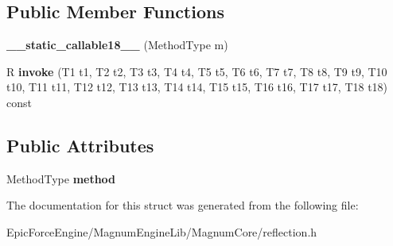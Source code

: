\subsection*{Public Member Functions}
\begin{DoxyCompactItemize}
\item 
{\bfseries \+\_\+\+\_\+static\+\_\+callable18\+\_\+\+\_\+} (Method\+Type m)\hypertarget{structagm_1_1reflection_1_1____static__callable18_____aedd0ddf4d37761fbb4f92e4c43f5e955}{}\label{structagm_1_1reflection_1_1____static__callable18_____aedd0ddf4d37761fbb4f92e4c43f5e955}

\item 
R {\bfseries invoke} (T1 t1, T2 t2, T3 t3, T4 t4, T5 t5, T6 t6, T7 t7, T8 t8, T9 t9, T10 t10, T11 t11, T12 t12, T13 t13, T14 t14, T15 t15, T16 t16, T17 t17, T18 t18) const \hypertarget{structagm_1_1reflection_1_1____static__callable18_____ad4e4f3c41e154b09f489d0ace9b7611f}{}\label{structagm_1_1reflection_1_1____static__callable18_____ad4e4f3c41e154b09f489d0ace9b7611f}

\end{DoxyCompactItemize}
\subsection*{Public Attributes}
\begin{DoxyCompactItemize}
\item 
Method\+Type {\bfseries method}\hypertarget{structagm_1_1reflection_1_1____static__callable18_____ad492e86dbfdf10c88bfc394c1d02a7c2}{}\label{structagm_1_1reflection_1_1____static__callable18_____ad492e86dbfdf10c88bfc394c1d02a7c2}

\end{DoxyCompactItemize}


The documentation for this struct was generated from the following file\+:\begin{DoxyCompactItemize}
\item 
Epic\+Force\+Engine/\+Magnum\+Engine\+Lib/\+Magnum\+Core/reflection.\+h\end{DoxyCompactItemize}
